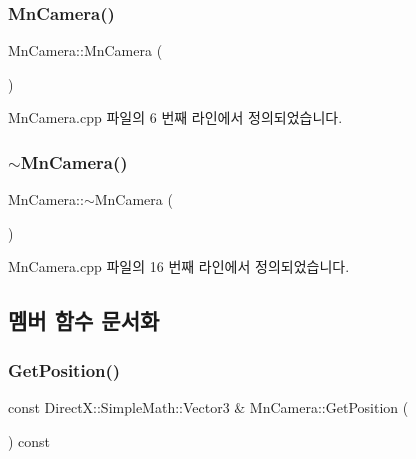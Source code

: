\subsubsection{\texorpdfstring{Mn\+Camera()}{MnCamera()}}
{\footnotesize\ttfamily Mn\+Camera\+::\+Mn\+Camera (\begin{DoxyParamCaption}{ }\end{DoxyParamCaption})}



Mn\+Camera.\+cpp 파일의 6 번째 라인에서 정의되었습니다.

\mbox{\label{class_m_n_l_1_1_mn_camera_aebde880f88a052f4e7133de9de74509e}} 
\subsubsection{\texorpdfstring{$\sim$\+Mn\+Camera()}{~MnCamera()}}
{\footnotesize\ttfamily Mn\+Camera\+::$\sim$\+Mn\+Camera (\begin{DoxyParamCaption}{ }\end{DoxyParamCaption})}



Mn\+Camera.\+cpp 파일의 16 번째 라인에서 정의되었습니다.



\subsection{멤버 함수 문서화}
\mbox{\label{class_m_n_l_1_1_mn_camera_a478d9bd34d90ae8bb06cdbb4193d48b7}} 
\subsubsection{\texorpdfstring{Get\+Position()}{GetPosition()}}
{\footnotesize\ttfamily const Direct\+X\+::\+Simple\+Math\+::\+Vector3 \& Mn\+Camera\+::\+Get\+Position (\begin{DoxyParamCaption}{ }\end{DoxyParamCaption}) const}



